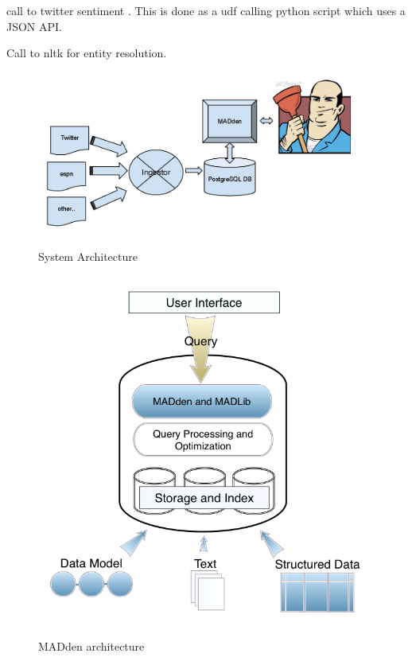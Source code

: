 \documentclass{article}
\newcommand{\system}{MADden\xspace}
\begin{document}
\begin{enumerate}
\begin{enumerate}
\begin{enumerate}
    \end{enumerate}






    call to twitter sentiment . This is done as a udf calling python script which uses a JSON API.

    Call to nltk for entity resolution.

    \begin{figure}
      \begin{center}
        \includegraphics[width=104mm]{architecture-1.png}
        \caption{System Architecture}
        \label{fig:architecture}
      \end{center}
    \end{figure}

    \begin{figure}
      \begin{center}
        \includegraphics[scale=0.4]{arch.png}
        \caption{{\system} architecture}
        \label{fig:arch}
      \end{center}
    \end{figure}


\end{enumerate}
\end{enumerate}
\end{document}
